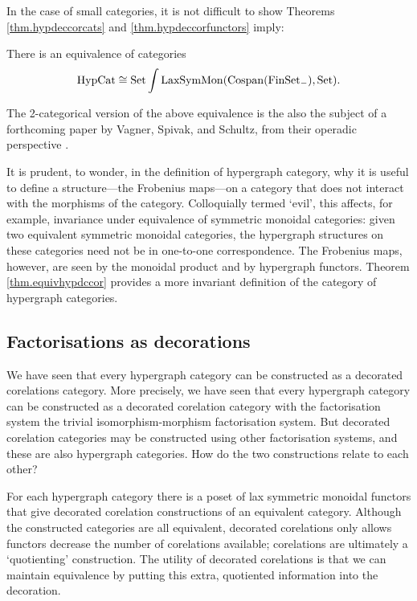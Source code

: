 In the case of small categories, it is not difficult to show Theorems
\ref{thm.hypdeccorcats} and \ref{thm.hypdeccorfunctors} imply:

\begin{theorem} \label{thm.equivhypdccor}
  There is an equivalence of categories
\[
  \mathrm{HypCat} \cong \mathrm{Set}\int \mathrm{LaxSymMon}(\operatorname{{Cospan}}(\mathrm{FinSet}_{-}), \mathrm{Set}).
\]
\end{theorem}

The 2-categorical version of the above equivalence is the also the subject of a
forthcoming paper by Vagner, Spivak, and Schultz, from their operadic
perspective \cite{SpiSchRup}.

\begin{remark}
  It is prudent, to wonder, in the definition of hypergraph category, why it is
  useful to define a structure---the Frobenius maps---on a category that does
  not interact with the morphisms of the category. Colloquially termed `evil',
  this affects, for example, invariance under equivalence of symmetric monoidal
  categories: given two equivalent symmetric monoidal categories, the
  hypergraph structures on these categories need not be in one-to-one
  correspondence. The Frobenius maps, however, are seen by the monoidal product
  and by hypergraph functors. Theorem \ref{thm.equivhypdccor} provides a more
  invariant definition of the category of hypergraph categories.
\end{remark}

\subsection{Factorisations as decorations}

We have seen that every hypergraph category can be constructed as a decorated
corelations category. More precisely, we have seen that every hypergraph
category can be constructed as a decorated corelation category with the
factorisation system the trivial isomorphism-morphism factorisation system. But
decorated corelation categories may be constructed using other factorisation
systems, and these are also hypergraph categories. How do the two constructions
relate to each other?

For each hypergraph category there is a poset of lax symmetric monoidal functors
that give decorated corelation constructions of an equivalent category.
Although the constructed categories are all equivalent, decorated corelations
only allows functors decrease the number of corelations available; corelations
are ultimately a `quotienting' construction.  The utility of decorated
corelations is that we can maintain equivalence by putting this extra,
quotiented information into the decoration.

